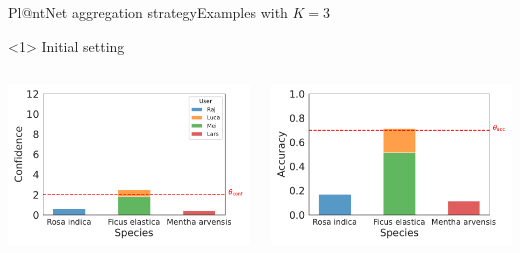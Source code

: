 \begin{frame}{Pl@ntNet aggregation strategy}{Examples with $K=3$}
    \begin{onlyenv}<1>
        Initial setting
        \begin{columns}
            \begin{column}{.5\textwidth}
                \begin{center}
                    \includegraphics[width=\textwidth]{./images/histplot_conf_init.pdf}
                \end{center}
            \end{column}
            \begin{column}{.5\textwidth}
                \begin{center}
                    \includegraphics[width=\textwidth]{./images/histplot_acc_init.pdf}

\end{center}
\end{column}
\end{columns}
\end{onlyenv}
\end{frame}
